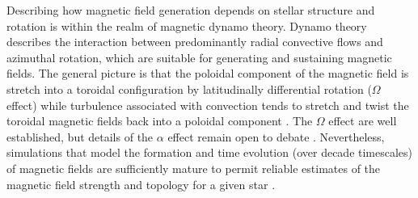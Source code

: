 Describing how magnetic field generation depends on stellar structure and rotation is within the realm of magnetic dynamo theory. Dynamo theory describes the interaction between predominantly radial convective flows and azimuthal rotation, which are suitable for generating and sustaining magnetic fields. The general picture is that the poloidal component of the magnetic field is stretch into a toroidal configuration by latitudinally differential rotation ($\Omega$ effect) while turbulence associated with convection tends to stretch and twist the toroidal magnetic fields back into a poloidal component \citep[$\alpha$ effect; e.g.,][]{Parker1955}. The $\Omega$ effect are well established, but details of the $\alpha$ effect remain open to debate \citep{Pipin2012}. Nevertheless, simulations that model the formation and time evolution (over decade timescales) of magnetic fields are sufficiently mature to permit reliable estimates of the magnetic field strength and topology for a given star \citep{Brandenburg2012}.